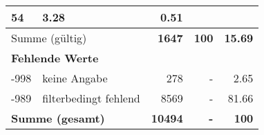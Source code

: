 \begin{longtable}{lXrrr}
       \num{54} &
       \num[round-mode=places,round-precision=2]{3.28} &
         \num[round-mode=places,round-precision=2]{0.51} \\
     \midrule
     \multicolumn{2}{l}{Summe (gültig)} &
       \textbf{\num{1647}} &
     \textbf{\num{100}} &
       \textbf{\num[round-mode=places,round-precision=2]{15.69}} \\
     \multicolumn{5}{l}{\textbf{Fehlende Werte}}\\
       -998 &
       keine Angabe &
         \num{278} &
        - &
         \num[round-mode=places,round-precision=2]{2.65} \\
       -989 &
       filterbedingt fehlend &
         \num{8569} &
        - &
         \num[round-mode=places,round-precision=2]{81.66} \\
     \midrule
     \multicolumn{2}{l}{\textbf{Summe (gesamt)}} &
          \textbf{\num{10494}} &
        \textbf{-} &
        \textbf{\num{100}} \\
     \bottomrule
     \end{longtable}
     
